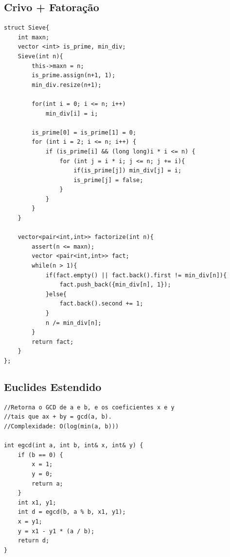 \documentclass[11pt, a4paper, twoside]{article}
\begin{document}
\subsection{Crivo + Fatoração}
\begin{verbatim}
struct Sieve{
    int maxn;
    vector <int> is_prime, min_div;
    Sieve(int n){
        this->maxn = n;
        is_prime.assign(n+1, 1);
        min_div.resize(n+1);
    
        for(int i = 0; i <= n; i++)
            min_div[i] = i;
    
        is_prime[0] = is_prime[1] = 0;
        for (int i = 2; i <= n; i++) {
            if (is_prime[i] && (long long)i * i <= n) {
                for (int j = i * i; j <= n; j += i){
                    if(is_prime[j]) min_div[j] = i;
                    is_prime[j] = false;
                }
            }
        }
    }
    
    vector<pair<int,int>> factorize(int n){
        assert(n <= maxn);
        vector <pair<int,int>> fact;
        while(n > 1){
            if(fact.empty() || fact.back().first != min_div[n]){
                fact.push_back({min_div[n], 1});
            }else{
                fact.back().second += 1;
            }
            n /= min_div[n];
        }
        return fact;
    }
};
\end{verbatim}

\subsection{Euclides Estendido}
\begin{verbatim}
//Retorna o GCD de a e b, e os coeficientes x e y
//tais que ax + by = gcd(a, b).
//Complexidade: O(log(min(a, b)))

int egcd(int a, int b, int& x, int& y) {
    if (b == 0) {
        x = 1;
        y = 0;
        return a;
    }
    int x1, y1;
    int d = egcd(b, a % b, x1, y1);
    x = y1;
    y = x1 - y1 * (a / b);
    return d;
}
\end{verbatim}
\end{document}
